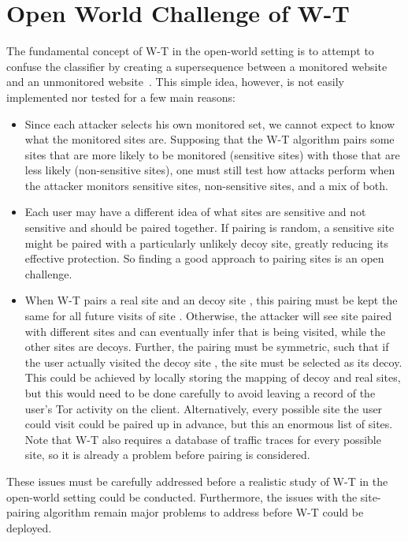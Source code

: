 \documentclass[USenglish,oneside,twocolumn]{article}
\begin{document}
\section{Open World Challenge of W-T}\label{discussion:OW-W-T}
The fundamental concept of W-T in the open-world setting is to attempt to confuse the classifier by creating a supersequence between a monitored website and an unmonitored website~\cite{wang2017walkie}. This simple idea, however, is not easily implemented nor tested for a few main reasons:
\begin{itemize}
    \item Since each attacker selects his own monitored set, we cannot expect to know what the monitored sites are. Supposing that the W-T algorithm pairs some sites that are more likely to be monitored (sensitive sites) with those that are less likely (non-sensitive sites), one must still test how attacks perform when the attacker monitors sensitive sites, non-sensitive sites, and a mix of both.
    
    \item Each user may have a different idea of what sites are sensitive and not sensitive and should be paired together. If pairing is random, a sensitive site might be paired with a particularly unlikely decoy site, greatly reducing its effective protection. So finding a good approach to pairing sites is an open challenge. 

    \item When W-T pairs a real site  and an decoy site , this pairing must be kept the same for all future visits of site . Otherwise, the attacker will see site  paired with different sites and can eventually infer that  is being visited, while the other sites are decoys. Further, the pairing must be symmetric, such that if the user actually visited the decoy site , the site  must be selected as its decoy. This could be achieved by locally storing the mapping of decoy and real sites, but this would need to be done carefully to avoid leaving a record of the user's Tor activity on the client. Alternatively, every possible site the user could visit could be paired up in advance, but this an enormous list of sites. Note that W-T also requires a database of traffic traces for every possible site, so it is already a problem before pairing is considered.
    






\end{itemize}
These issues must be carefully addressed before a realistic study of W-T in the open-world setting could be conducted. Furthermore, the issues with the site-pairing algorithm remain major problems to address before W-T could be deployed.
 
\end{document}
